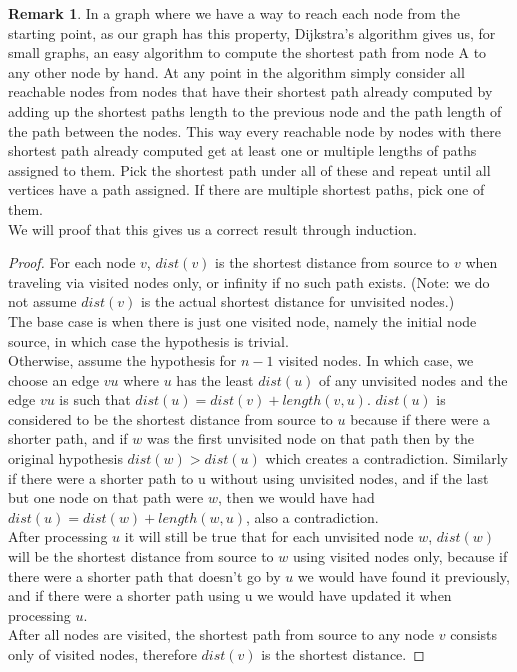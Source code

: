 \documentclass{article}
\theoremstyle{definition}
\newtheorem{remark}[theorem]{Remark}
\begin{document}
\begin{remark}
In a graph where we have a way to reach each node from the starting point, as our graph has this property, Dijkstra's algorithm gives us, for small graphs, an easy algorithm to compute the shortest path from node A to any other node by hand. At any point in the algorithm simply consider all reachable nodes from nodes that have their shortest path already computed by adding up the shortest paths length to the previous node and the path length of the path between the nodes. This way every reachable node by nodes with there shortest path already computed get at least one or multiple lengths of paths assigned to them. Pick the shortest path under all of these and repeat until all vertices have a path assigned. If there are multiple shortest paths, pick one of them. \\
We will proof that this gives us a correct result through induction.
\begin{proof} 
For each node $v$, $dist(v)$ is the shortest distance from source to $v$ when traveling via visited nodes only, or infinity if no such path exists. (Note: we do not assume $dist(v)$ is the actual shortest distance for unvisited nodes.) \\
The base case is when there is just one visited node, namely the initial node source, in which case the hypothesis is trivial. \\
Otherwise, assume the hypothesis for $n-1$ visited nodes. In which case, we choose an edge $vu$ where $u$ has the least $dist(u)$ of any unvisited nodes and the edge $vu$ is such that $dist(u) = dist(v) + length(v,u)$. $dist(u)$ is considered to be the shortest distance from source to $u$ because if there were a shorter path, and if $w$ was the first unvisited node on that path then by the original hypothesis $dist(w) > dist(u)$ which creates a contradiction. Similarly if there were a shorter path to u without using unvisited nodes, and if the last but one node on that path were $w$, then we would have had $dist(u) = dist(w) + length(w,u)$, also a contradiction. \\
After processing $u$ it will still be true that for each unvisited node $w$, $dist(w)$ will be the shortest distance from source to $w$ using visited nodes only, because if there were a shorter path that doesn't go by $u$ we would have found it previously, and if there were a shorter path using u we would have updated it when processing $u$. \\
After all nodes are visited, the shortest path from source to any node $v$ consists only of visited nodes, therefore $dist(v)$ is the shortest distance.
\end{proof}


\end{remark}
\end{document}
